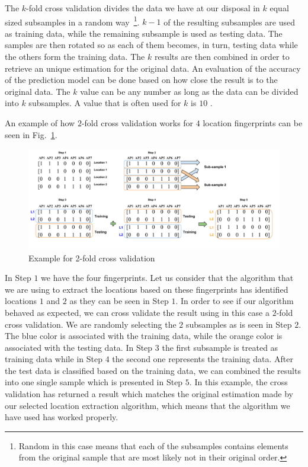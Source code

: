The $k$-fold cross validation divides the data we have at our disposal in $k$
equal sized subsamples in a random way~\footnote{Random in this case means that
each of the subsamples contains elements from the original sample that are most
likely not in their original order.}. $k-1$ of the resulting subsamples are used
as training data, while the remaining subsample is used as testing data.
The samples are then rotated so as each of them becomes, in turn, testing data
while the others form the training data. The $k$ results are then combined in
order to retrieve an unique estimation for the original data. An evaluation of
the accuracy of the prediction model can be done based on how close the result
is to the original data. The $k$ value can be any number as long as the data can
be divided into $k$ subsamples. A value that is often used for $k$ is $10$
\cite{mclachlan2005analyzing}.

An example of how $2$-fold cross validation works for $4$ location fingerprints
can be seen in Fig.~\ref{2foldvalid}.

\begin{figure}[!h]
\centering
\includegraphics[width=\textwidth]{figures/kmeans/2-fold-validation.png}
\caption{Example for 2-fold cross validation}
\label{2foldvalid}
\end{figure}

In Step $1$ we have the four fingerprints. Let us consider that the algorithm
that we are using to extract the locations based on these fingerprints has
identified locations $1$ and $2$ as they can be seen in Step $1$. In order to
see if our algorithm behaved as expected, we can cross validate the result using
in this case a $2$-fold cross validation. We are randomly selecting the $2$
subsamples as is seen in Step $2$. The blue color is associated with the
training data, while the orange color is associated with the testing data. In
Step $3$ the first subsample is treated as training data while in Step $4$ the
second one represents the training data. After the test data is classified based
on the training data, we can combined the results into one single sample which
is presented in Step $5$. In this example, the cross validation has returned a
result which matches the original estimation made by our selected location
extraction algorithm, which means that the algorithm we have used has worked
properly.

